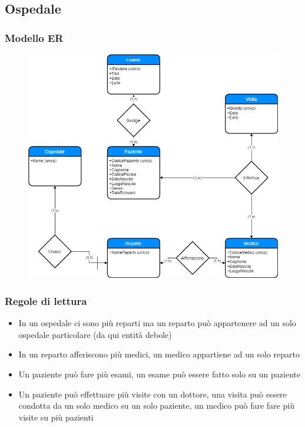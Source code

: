 \documentclass{article}
\begin{document}
	\pagebreak
	
	\subsection{Ospedale}
	\subsubsection{Modello ER}
	\begin{figure}[h!]
		\centering
		\includegraphics[scale=0.5]{images/Ospedale.png}
	\end{figure}
	\subsubsection{Regole di lettura}
	\begin{itemize}
		\item In un ospedale ci sono più reparti ma un reparto può appartenere ad un solo ospedale particolare (da qui entità debole)
		\item In un reparto afferiscono più medici, un medico appartiene ad un solo reparto
		\item Un paziente può fare più esami, un esame può essere fatto solo su un paziente
		\item Un paziente può effettuare più visite con un dottore, una visita può essere condotta da un solo medico su un solo paziente, un medico può fare fare più visite su più pazienti
	\end{itemize}
\end{document}
